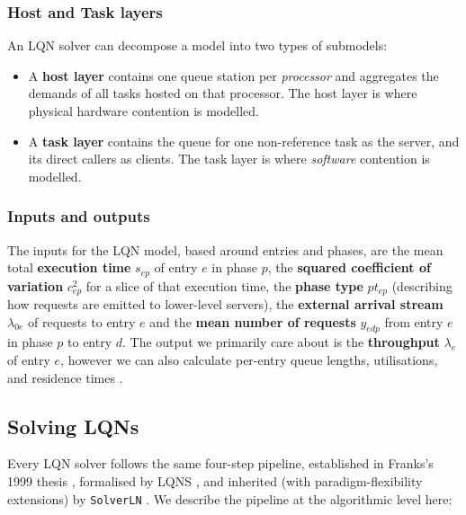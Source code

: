 \subsubsection*{Host and Task layers}

An LQN solver can decompose a model into two types of submodels:

\begin{itemize}
\item A \textbf{host layer} contains one queue station per \textit{processor} and aggregates the demands of all tasks hosted on that processor. The host layer is where physical hardware contention is modelled.
\item A \textbf{task layer} contains the queue for one non-reference task as the server, and its direct callers as clients. The task layer is where \textit{software} contention is modelled.
\end{itemize}


\subsubsection*{Inputs and outputs}

The inputs for the LQN model, based around entries and phases, are the mean total \textbf{execution time} $s_{ep}$ of entry $e$ in phase $p$, the \textbf{squared coefficient of variation} $c^2_{ep}$ for a slice of that execution time, the \textbf{phase type} $pt_{ep}$ (describing how requests are emitted to lower-level servers), the \textbf{external arrival stream} $\lambda_{0e}$ of requests to entry $e$ and the \textbf{mean number of requests} $y_{edp}$ from entry $e$ in phase $p$ to entry $d$. The output we primarily care about is the \textbf{throughput} $\lambda_e$ of entry $e$, however we can also calculate per-entry queue lengths, utilisations, and residence times \cite{franks99}.


\subsection{Solving LQNs}
\label{sec:lqn-solving}

Every LQN solver follows the same four-step pipeline, established in Franks's 1999 thesis \cite{franks99}, formalised by LQNS \cite{franks2009}, and inherited (with paradigm-flexibility extensions) by \texttt{SolverLN} \cite{casale2024}. We describe the pipeline at the algorithmic level here:


